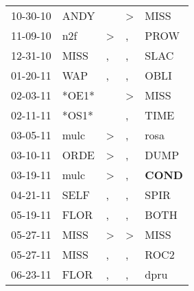 \begin{supertabular}{p{0.07\textwidth}p{0.06\textwidth}p{0.02\textwidth}p{0.02\textwidth}p{0.06\textwidth}}
          10-30-10\textsuperscript{} &           ANDY\textsuperscript{} &                  &     \textgreater &           MISS\textsuperscript{} \\
          11-09-10\textsuperscript{} &            n2f\textsuperscript{} &     \textgreater &                , &           PROW\textsuperscript{} \\
          12-31-10\textsuperscript{} &           MISS\textsuperscript{} &                , &                , &           SLAC\textsuperscript{} \\
          01-20-11\textsuperscript{} &            WAP\textsuperscript{} &                , &                , &           OBLI\textsuperscript{} \\
          02-03-11\textsuperscript{} &                            *OE1* &                  &     \textgreater &           MISS\textsuperscript{} \\
          02-11-11\textsuperscript{} &                            *OS1* &                  &                , &           TIME\textsuperscript{} \\
          03-05-11\textsuperscript{} &           mulc\textsuperscript{} &     \textgreater &                , &           rosa\textsuperscript{} \\
          03-10-11\textsuperscript{} &           ORDE\textsuperscript{} &     \textgreater &                , &           DUMP\textsuperscript{} \\
          03-19-11\textsuperscript{} &           mulc\textsuperscript{} &     \textgreater &                , &  \textbf{COND\textsuperscript{}} \\
          04-21-11\textsuperscript{} &           SELF\textsuperscript{} &                , &                , &           SPIR\textsuperscript{} \\
          05-19-11\textsuperscript{} &           FLOR\textsuperscript{} &                , &                , &           BOTH\textsuperscript{} \\
          05-27-11\textsuperscript{} &           MISS\textsuperscript{} &     \textgreater &     \textgreater &           MISS\textsuperscript{} \\
          05-27-11\textsuperscript{} &           MISS\textsuperscript{} &                , &                , &           ROC2\textsuperscript{} \\
          06-23-11\textsuperscript{} &           FLOR\textsuperscript{} &                , &                , &           dpru\textsuperscript{} \\

\end{supertabular}
